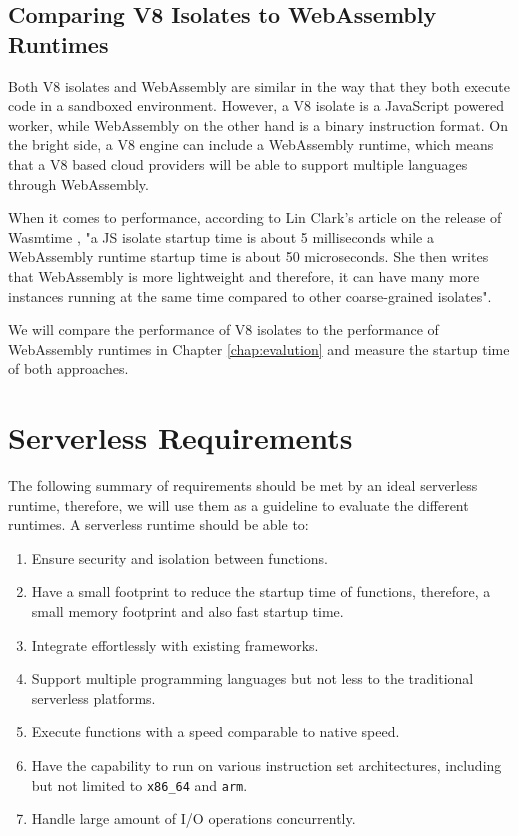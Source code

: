 \subsection{Comparing V8 Isolates to WebAssembly Runtimes}

Both \gls{V8} isolates and WebAssembly are similar in the way that they both execute code in a sandboxed environment. However, a V8 isolate is a JavaScript powered worker, while WebAssembly on the other hand is a binary instruction format. On the bright side, a V8 engine can include a WebAssembly runtime, which means that a V8 based cloud providers will be able to support multiple languages through WebAssembly. 

When it comes to performance, according to Lin Clark's article on the release of Wasmtime \cite{clark_2022_wasmtime}, "a JS isolate startup time is about 5 milliseconds while a WebAssembly runtime startup time is about 50 microseconds. She then writes that WebAssembly is more lightweight and therefore, it can have many more instances running at the same time compared to other coarse-grained isolates". 

We will compare the performance of V8 isolates to the performance of WebAssembly runtimes in Chapter \ref{chap:evalution} and measure the startup time of both approaches. 

\section{Serverless Requirements}
\label{sec:serverless-requirements}

The following summary of requirements should be met by an ideal serverless runtime, therefore, we will use them as a guideline to evaluate the different runtimes. 
A serverless runtime should be able to:
%
\begin{enumerate}
	\item Ensure security and isolation between functions.
	\item Have a small footprint to reduce the startup time of functions, therefore, a small memory footprint and also fast startup time. 
	\item Integrate effortlessly with existing frameworks. 
	\item Support multiple programming languages but not less to the traditional serverless platforms. 
	\item Execute functions with a speed comparable to native speed.
	\item Have the capability to run on various instruction set architectures, including but not limited to \texttt{x86\_64} and \texttt{arm}.
	\item Handle large amount of I/O operations concurrently.
\end{enumerate}

